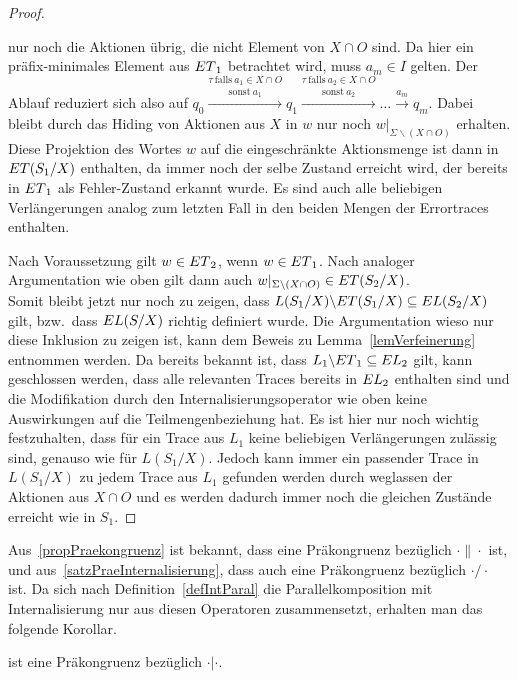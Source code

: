 \begin{proof}
\begin{itemize}
      nur noch die Aktionen übrig, die nicht Element von $X\cap O$ sind. Da
      hier ein präfix-minimales Element aus $ET{}_1$ betrachtet wird, muss
      $a_m\in I$ gelten. Der Ablauf reduziert sich also auf
      $q_0 \overset{\tau~\mathrm{falls}~a_1\in X\cap
      O}{\overset{\mathrm{sonst}~a_1}{\longrightarrow}} q_1
      \overset{\tau~\mathrm{falls}~a_2\in X\cap
      O}{\overset{\mathrm{sonst}~a_2}{\longrightarrow}} \dots
      \overset{a_m}{\rightarrow} q_m$. Dabei bleibt durch das Hiding von
      Aktionen aus $X$ in $w$ nur noch $w|_{\Sigma\backslash (X\cap O)}$
      erhalten. Diese Projektion des Wortes $w$ auf die eingeschränkte
      Aktionsmenge ist dann in $ET{}(S_1/X)$ enthalten, da immer noch der
      selbe Zustand erreicht wird, der bereits in $ET{}_1$ als Fehler-Zustand
      erkannt wurde. Es sind auch alle beliebigen Verlängerungen analog zum
      letzten Fall in den beiden Mengen der Errortraces enthalten.
  \end{itemize}
  Nach Voraussetzung gilt $w\in ET{}_2$, wenn $w\in ET{}_1$. Nach analoger
  Argumentation wie oben gilt dann auch $w|_{\Sigma\backslash (X\cap
  O)}\in ET{}(S_2/X)$.\\
  Somit bleibt jetzt nur noch zu zeigen, dass $L(S_1/X)\backslash ET{}(S_1/X)
  \subseteq EL(S_2/X)$ gilt, bzw.\ dass $EL{}(S/X)$ richtig definiert wurde.
  Die Argumentation wieso nur diese Inklusion zu zeigen ist, kann dem Beweis zu
  Lemma~\ref{lemVerfeinerung} entnommen werden. Da bereits bekannt ist, dass
  $L_1\backslash ET{}_1\subseteq EL{}_2$ gilt, kann geschlossen werden, dass
  alle relevanten Traces bereits in $EL{}_2$ enthalten sind und die
  Modifikation durch den Internalisierungsoperator wie oben keine Auswirkungen
  auf die Teilmengenbeziehung hat. Es ist hier nur noch wichtig festzuhalten,
  dass für ein Trace aus $L_1$ keine beliebigen Verlängerungen zulässig sind,
  genauso wie für $L(S_1/X)$. Jedoch kann immer ein passender Trace in
  $L(S_1/X)$ zu jedem Trace aus $L_1$ gefunden werden durch weglassen der
  Aktionen aus $X\cap O$ und es werden dadurch immer noch die gleichen Zustände
  erreicht wie in $S_1$.
\end{proof}

Aus~\ref{propPraekongruenz} ist bekannt, dass \ERel{} eine Präkongruenz
bezüglich $\cdot\|\cdot$ ist, und aus~\ref{satzPraeInternalisierung}, dass
\ERel{} auch eine Präkongruenz bezüglich $\cdot/\cdot$ ist. Da sich nach
Definition~\ref{defIntParal} die Parallelkomposition mit Internalisierung nur
aus diesen Operatoren zusammensetzt, erhalten man das folgende Korollar.

\begin{kor}
  \ERel{} ist eine Präkongruenz bezüglich $\cdot|\cdot$.
\end{kor}
